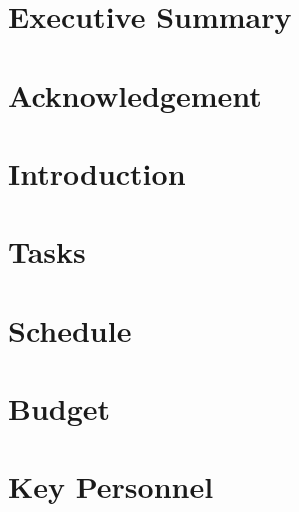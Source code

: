\documentclass{article}
\begin{document}


\newpage
\tableofcontents

\section{Executive Summary}


\section{Acknowledgement}


\section{Introduction}













\section{Tasks}

\section{Schedule}

\section{Budget}


\section{Key Personnel}


\newpage

\end{document}
